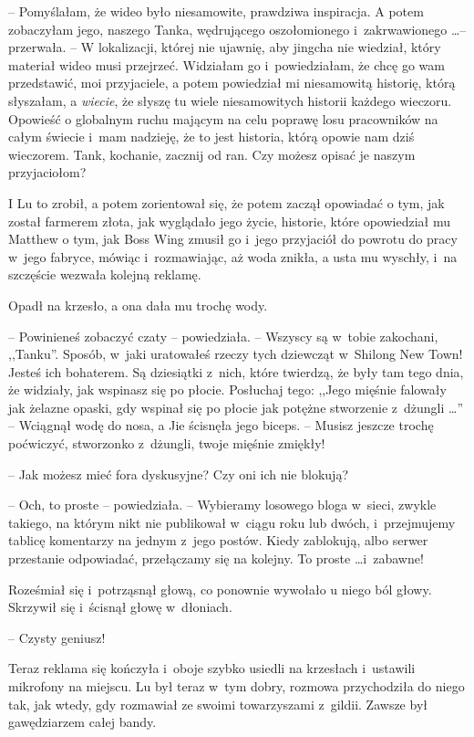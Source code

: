 \documentclass[oneside,polish,11pt,rmheadings]{mwbk}
\begin{document}
-- Pomyślałam, że wideo było niesamowite, prawdziwa inspiracja. A potem zobaczyłam jego, naszego Tanka, wędrującego oszołomionego i~zakrwawionego \ldots  -- przerwała. -- W lokalizacji, której nie ujawnię, aby jingcha nie wiedział, który materiał wideo musi przejrzeć. Widziałam go i~powiedziałam, że chcę go wam przedstawić, moi przyjaciele, a potem powiedział mi niesamowitą historię, którą słyszałam, a \textit{wiecie}, że słyszę tu wiele niesamowitych historii każdego wieczoru. Opowieść o globalnym ruchu mającym na celu poprawę losu pracowników na całym świecie i~mam nadzieję, że to jest historia, którą opowie nam dziś wieczorem. Tank, kochanie, zacznij od ran. Czy możesz opisać je naszym przyjaciołom?

I Lu to zrobił, a potem zorientował się, że potem zaczął opowiadać o tym, jak został farmerem złota, jak wyglądało jego życie, historie, które opowiedział mu Matthew o tym, jak Boss Wing zmusił go i~jego przyjaciół do powrotu do pracy w~jego fabryce, mówiąc i~rozmawiając, aż woda znikła, a usta mu wyschły, i~na szczęście wezwała kolejną reklamę.

Opadł na krzesło, a ona dała mu trochę wody. 

-- Powinieneś zobaczyć czaty -- powiedziała. -- Wszyscy są w~tobie zakochani, ,,Tanku''. Sposób, w~jaki uratowałeś rzeczy tych dziewcząt w~Shilong New Town! Jesteś ich bohaterem. Są dziesiątki z~nich, które twierdzą, że były tam tego dnia, że widziały, jak wspinasz się po płocie. Posłuchaj tego: ,,Jego mięśnie falowały jak żelazne opaski, gdy wspinał się po płocie jak potężne stworzenie z~dżungli \ldots '' -- Wciągnął wodę do nosa, a Jie ścisnęła jego biceps. -- Musisz jeszcze trochę poćwiczyć, stworzonko z~dżungli, twoje mięśnie zmiękły! 

-- Jak możesz mieć fora dyskusyjne? Czy oni ich nie blokują? 

-- Och, to proste -- powiedziała. -- Wybieramy losowego bloga w~sieci, zwykle takiego, na którym nikt nie publikował w~ciągu roku lub dwóch, i~przejmujemy tablicę komentarzy na jednym z~jego postów. Kiedy zablokują, albo serwer przestanie odpowiadać, przełączamy się na kolejny. To proste  \ldots  i~zabawne! 

Roześmiał się i~potrząsnął głową, co ponownie wywołało u niego ból głowy. Skrzywił się i~ścisnął głowę w~dłoniach. 

-- Czysty geniusz!

Teraz reklama się kończyła i~oboje szybko usiedli na krzesłach i~ustawili mikrofony na miejscu. Lu był teraz w~tym dobry, rozmowa przychodziła do niego tak, jak wtedy, gdy rozmawiał ze swoimi towarzyszami z~gildii. Zawsze był gawędziarzem całej bandy.
\end{document}
